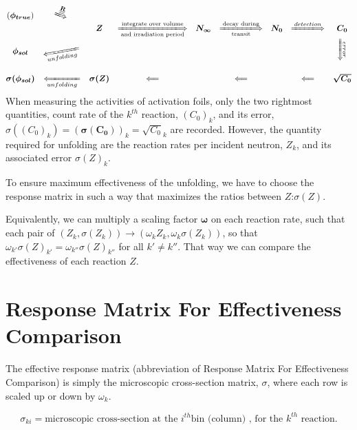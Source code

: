 \documentclass[a4paper, 12pt]{article}
\newcommand{\matr}[1]{\underline{\underline{\textbf{#1}}}}
\newcommand{\ve}[1]{\boldsymbol{#1}}
\begin{document}
\begin{equation}
    \begin{matrix}
        (\ve{\phi_{true}}) & \rotatebox[origin=c]{-20}{$\xLongrightarrow{\matr{R}}$}\\
        && \ve{Z} & \xLongrightarrow[\text{and irradiation period}]{\text{integrate over volume}} & \ve{N_\infty} & \xLongrightarrow[\text{transit}]{\text{decay during}} & \ve{N_0} & \xLongrightarrow{detection} & \ve{C_0}\\
        \ve{\phi_{sol}} & \rotatebox[origin=c]{10}{$\xLongleftarrow[unfolding]{}$} &&&&&&& \rotatebox[origin=c]{-90}{$\xLongrightarrow{error}$}\\
        &&&& &&&&\\
        \ve{\sigma(\phi_{sol})}&\xLongleftarrow[unfolding]{}&\ve{\sigma(Z)}&\Longleftarrow&&\Longleftarrow && \Longleftarrow & \ve{\sqrt{C_0}}
    \end{matrix}
    \label{Unfolding process}
\end{equation}
When measuring the activities of activation foils, only the two rightmost quantities, count rate of the $k^{th}$ reaction, $(C_0)_k$, and its error, $\sigma((C_0)_k) = (\ve{\sigma(C_0)})_k = \sqrt{C_0}_k$ are recorded.
However, the quantity required for unfolding are the reaction rates per incident neutron, $Z_k$, and its associated error $\sigma(Z)_k$.

To ensure maximum effectiveness of the unfolding, we have to choose the response matrix in such a way that maximizes the ratios between $Z$:$\sigma(Z)$.

Equivalently, we can multiply a scaling factor $\ve{\omega}$ on each reaction rate, such that each pair of $(Z_k, \sigma(Z_k))\to(\omega_k Z_k, \omega_k\sigma(Z_k))$, so that $\omega_{k'}\sigma(Z)_{k' }= \omega_{k''}\sigma(Z)_{k''}$ for all $k'\neq k''$. That way we can compare the effectiveness of each reaction $Z$.

\section{Response Matrix For Effectiveness Comparison} \label{Response Matrix For Effectiveness Comparison}
The effective response matrix (abbreviation of Response Matrix For Effectiveness Comparison) is simply the microscopic cross-section matrix, \matr{$\sigma$}, where each row is scaled up or down by $\omega_k$.

\begin{equation}
    \sigma_{ki} = \text{microscopic cross-section at the } i^{th} \text{bin (column) , for the } k^{th} \text{ reaction.}
\end{equation}
\end{document}
